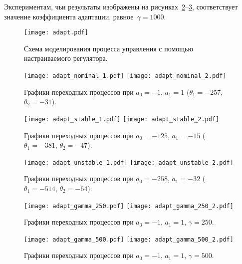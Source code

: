 Экспериментам, чьи результаты изображены на рисунках~\ref{img_adapt_nominal}--\ref{img_adapt_unstable}, соответствует значение коэффициента адаптации, равное~$\gamma=1000$.

\vspace{1.5cm}

\begin{figure}[h!]
    \centering
    \texttt{[image: adapt.pdf]}
    \caption{Схема моделирования процесса управления с помощью настраиваемого регулятора.}
    \label{img_adapt}
\end{figure}


\begin{figure}[h!]
    \centering
    \texttt{[image: adapt\_nominal\_1.pdf]}
    \texttt{[image: adapt\_nominal\_2.pdf]}
    \caption{Графики переходных процессов при $a_0=-1$, $a_1 = 1$ ($\theta_1 = -257$, $\theta_2 = -31$).}
    \label{img_adapt_nominal}
\end{figure}

\begin{figure}[h!]
    \centering
    \texttt{[image: adapt\_stable\_1.pdf]}
    \texttt{[image: adapt\_stable\_2.pdf]}
    \caption{Графики переходных процессов при $a_0=-125$, $a_1 = -15$ ($\theta_1 = -381$, $\theta_2 = -47$).}
\end{figure}

\begin{figure}[h!]
    \centering
    \texttt{[image: adapt\_unstable\_1.pdf]}
    \texttt{[image: adapt\_unstable\_2.pdf]}
    \caption{Графики переходных процессов при $a_0=-258$, $a_1 = -32$ ($\theta_1 = -514$, $\theta_2 = -64$).}
    \label{img_adapt_unstable}
\end{figure}

\begin{figure}[h!]
    \centering
    \texttt{[image: adapt\_gamma\_250.pdf]}
    \texttt{[image: adapt\_gamma\_250\_2.pdf]}
    \caption{Графики переходных процессов при $a_0=-1$, $a_1 = 1$, $\gamma = 250$.}
    \label{img_adapt_gamma_250}
\end{figure}

\begin{figure}[h!]
    \centering
    \texttt{[image: adapt\_gamma\_500.pdf]}
    \texttt{[image: adapt\_gamma\_500\_2.pdf]}
    \caption{Графики переходных процессов при $a_0=-1$, $a_1 = 1$, $\gamma=500$.}
\end{figure}

